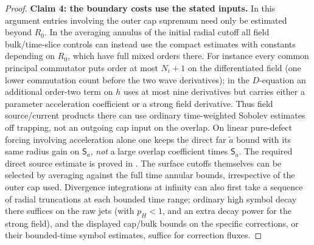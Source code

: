 \begin{proof}
\par\medskip\noindent\textbf{Claim 4: the boundary costs use the stated inputs.}\quad
In this argument entries involving the outer cap supremum need only be estimated beyond \(R_0\). In the averaging annulus of the initial radial cutoff all field bulk/time-slice controls can instead use the compact estimates with constants depending on \(R_0\), which have full mixed orders there. For instance every common principal commutator puts order at most \(N_i+1\) on the differentiated field (one lower commutation count before the two wave derivatives); in the \(D\)-equation an additional order-two term on \(h\) uses at most nine derivatives but carries either a parameter acceleration coefficient or a strong field derivative. Thus field source/current products there can use ordinary time-weighted Sobolev estimates off trapping, not an outgoing cap input on the overlap. On linear pure-defect forcing involving acceleration alone one keeps the direct far \(\widetilde a\) bound with its same radius gain on \(\mathsf S_a\), \emph{not} a large overlap coefficient times \(\mathsf S_a\). The required direct source estimate is proved in . The surface cutoffs themselves can be selected by averaging against the full time annular bounds, irrespective of the outer cap used. Divergence integrations at infinity can also first take a sequence of radial truncations at each bounded time range; ordinary high symbol decay there suffices on the raw jets (with \(p_H<1\), and an extra decay power for the strong field), and the displayed cap/bulk bounds on the specific corrections, or their bounded-time symbol estimates, suffice for correction fluxes.


\end{proof}
